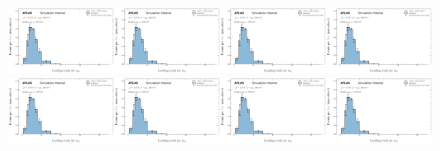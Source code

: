 \begin{figure}[h!]
\includegraphics[width=0.25\textwidth,page=13]{figures/SimResults/MultiFoldTotalErrors.pdf}\includegraphics[width=0.25\textwidth,page=14]{figures/SimResults/MultiFoldTotalErrors.pdf}\includegraphics[width=0.25\textwidth,page=15]{figures/SimResults/MultiFoldTotalErrors.pdf}\includegraphics[width=0.25\textwidth,page=16]{figures/SimResults/MultiFoldTotalErrors.pdf}\\
\includegraphics[width=0.25\textwidth,page=17]{figures/SimResults/MultiFoldTotalErrors.pdf}\includegraphics[width=0.25\textwidth,page=18]{figures/SimResults/MultiFoldTotalErrors.pdf}\includegraphics[width=0.25\textwidth,page=19]{figures/SimResults/MultiFoldTotalErrors.pdf}\includegraphics[width=0.25\textwidth,page=20]{figures/SimResults/MultiFoldTotalErrors.pdf}\\

\end{figure}
